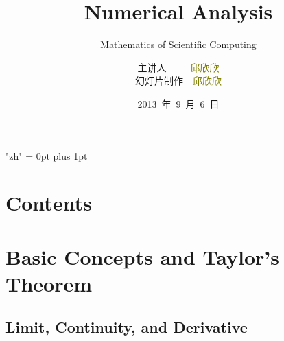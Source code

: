 \documentclass[notheorems,mathserif,table,compress]{beamer}  %
\begin{document}
\XeTeXlinebreaklocale "zh"         %
\XeTeXlinebreakskip = 0pt plus 1pt %


\title[Numerical Analysis]{Numerical Analysis}
\subtitle{Mathematics of Scientific Computing}
\author[qiu]{主讲人~~~~~\textcolor{olive}{邱欣欣}\\
    \quad 幻灯片制作~~\textcolor{olive}{邱欣欣}}
\institute[中国海洋大学]{\small\textcolor{violet}{中国海洋大学~~信息科学与工程学院}}
\date{2013~年~9~月~6~日}
\frame{ \titlepage }
\section*{Contents}



\section{Basic Concepts and Taylor's Theorem}

\subsection{Limit, Continuity, and Derivative}

\end{document}
